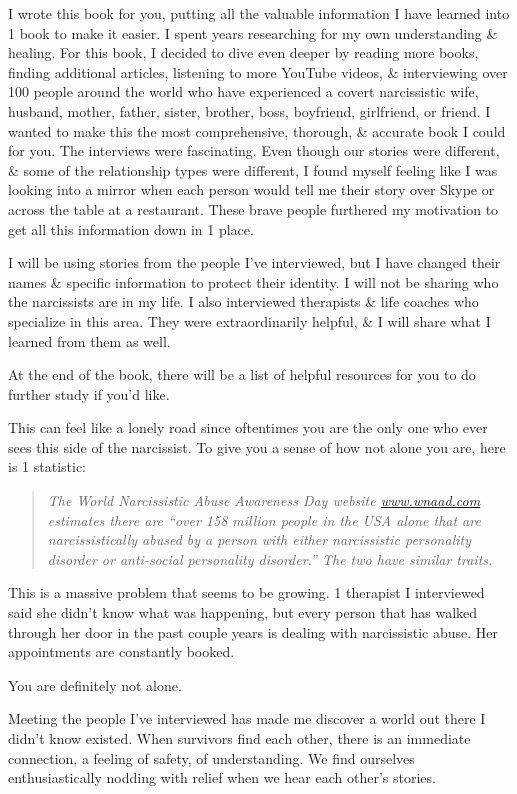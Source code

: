 \documentclass{article}
\numberwithin{equation}{section}
\begin{document}
I wrote this book for you, putting all the valuable information I have learned into 1 book to make it easier. I spent years researching for my own understanding \& healing. For this book, I decided to dive even deeper by reading more books, finding additional articles, listening to more YouTube videos, \& interviewing over 100 people around the world who have experienced a covert narcissistic wife, husband, mother, father, sister, brother, boss, boyfriend, girlfriend, or friend. I wanted to make this the most comprehensive, thorough, \& accurate book I could for you. The interviews were fascinating. Even though our stories were different, \& some of the relationship types were different, I found myself feeling like I was looking into a mirror when each person would tell me their story over Skype or across the table at a restaurant. These brave people furthered my motivation to get all this information down in 1 place.

I will be using stories from the people I've interviewed, but I have changed their names \& specific information to protect their identity. I will not be sharing who the narcissists are in my life. I also interviewed therapists \& life coaches who specialize in this area. They were extraordinarily helpful, \& I will share what I learned from them as well.

At the end of the book, there will be a list of helpful resources for you to do further study if you'd like.

This can feel like a lonely road since oftentimes you are the only one who ever sees this side of the narcissist. To give you a sense of how not alone you are, here is 1 statistic:
\begin{quotation}\it
	The World Narcissistic Abuse Awareness Day website \url{www.wnaad.com} estimates there are ``over 158 million people in the USA alone that are narcissistically abused by a person with either narcissistic personality disorder or anti-social personality disorder.'' The two have similar traits.
\end{quotation}
This is a massive problem that seems to be growing. 1 therapist I interviewed said she didn't know what was happening, but every person that has walked through her door in the past couple years is dealing with narcissistic abuse. Her appointments are constantly booked.

You are definitely not alone.

Meeting the people I've interviewed has made me discover a world out there I didn't know existed. When survivors find each other, there is an immediate connection, a feeling of safety, of understanding. We find ourselves enthusiastically nodding with relief when we hear each other's stories.
\end{document}

